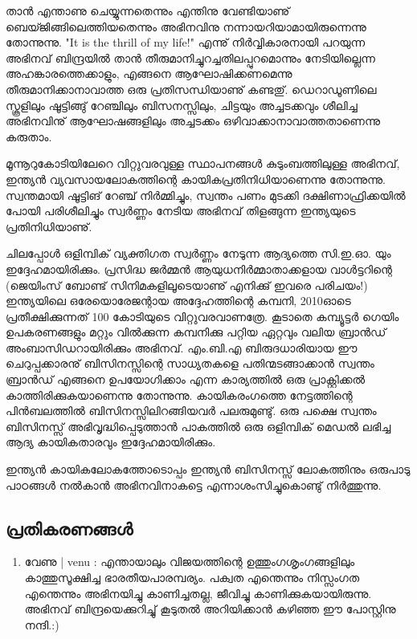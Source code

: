 ﻿
\vskip 2pt

താന്‍ എന്താണു ചെയ്യുന്നതെന്നും എന്തിനു വേണ്ടിയാണു് ബെയ്ജിങ്ങിലെത്തിയതെന്നും അഭിനവിനു നന്നായറിയാമായിരുന്നെന്നു തോന്നുന്നു. "It is the thrill of my life!" എന്നു് നിര്‍വ്വികാരനായി പറയുന്ന അഭിനവ് ബിന്ദ്രയില്‍ താന്‍ തീരുമാനിച്ചുറച്ചതിലപ്പുറമൊന്നും നേടിയില്ലെന്ന അഹങ്കാരത്തെക്കാളും, എങ്ങനെ ആഘോഷിക്കണമെന്നു തീരുമാനിക്കാനാവാത്ത ഒരു പ്രതിസന്ധിയാണു് കണ്ടതു്. ഡെറാഡൂണിലെ സ്കൂളിലും ഷൂട്ടിങ്ങു് റേഞ്ചിലും ബിസനസ്സിലും, ചിട്ടയും അച്ചടക്കവും ശീലിച്ച അഭിനവിനു് ആഘോഷങ്ങളിലും അച്ചടക്കം ഒഴിവാക്കാനാവാത്തതാണെന്നു കരുതാം.

മൂന്നൂറുകോടിയിലേറെ വിറ്റുവരവുള്ള സ്ഥാപനങ്ങള്‍ കുടുംബത്തിലുള്ള അഭിനവ്, ഇന്ത്യന്‍ വ്യവസായലോകത്തിന്റെ കായികപ്രതിനിധിയാണെന്നു തോന്നുന്നു. സ്വന്തമായി ഷൂട്ടിങ് റേഞ്ച് നിര്‍മ്മിച്ചും, സ്വന്തം പണം മുടക്കി ദക്ഷിണാഫ്രിക്കയില്‍ പോയി പരിശീലിച്ചും സ്വര്‍ണ്ണം നേടിയ അഭിനവ് തിളങ്ങുന്ന ഇന്ത്യയുടെ പ്രതിനിധിയാണു്.

ചിലപ്പോള്‍ ഒളിമ്പിക് വ്യക്തിഗത സ്വര്‍ണ്ണം നേടുന്ന ആദ്യത്തെ സി.ഇ.ഓ. യും ഇദ്ദേഹമായിരിക്കും. പ്രസിദ്ധ ജര്‍മ്മന്‍ ആയുധനിര്‍മ്മാതാക്കളായ വാള്‍ട്ടറിന്റെ (ജെയിംസ് ബോണ്ട് സിനിമകളിലൂടെയാണു് എനിക്കു് ഇവരെ പരിചയം!) ഇന്ത്യയിലെ ഒരേയൊരേജന്റായ അദ്ദേഹത്തിന്റെ കമ്പനി, 2010ഓടെ പ്രതീക്ഷിക്കുന്നത് 100 കോടിയുടെ വിറ്റുവരവാണത്രേ. കൂടാതെ കമ്പ്യൂട്ടര്‍ ഗെയിം ഉപകരണങ്ങളും മറ്റും വില്‍ക്കുന്ന കമ്പനിക്കു പറ്റിയ ഏറ്റവും വലിയ ബ്രാന്‍ഡ് അംബാസിഡറായിരിക്കും അഭിനവ്. എം.ബി.എ ബിരുദധാരിയായ ഈ ചെറുപ്പക്കാരനു് ബിസിനസ്സിന്റെ സാധ്യതകളെ പതിന്മടങ്ങാക്കാന്‍ സ്വന്തം ബ്രാന്‍ഡ് എങ്ങനെ ഉപയോഗിക്കാം എന്ന കാര്യത്തില്‍ ഒരു പ്രാക്റ്റിക്കല്‍ കാത്തിരിക്കുകയാണെന്നു തോന്നുന്നു. കായികരംഗത്തെ നേട്ടത്തിന്റെ പിന്‍ബലത്തില്‍ ബിസിനസ്സിലിറങ്ങിയവര്‍ പലരുമുണ്ടു്. ഒരു പക്ഷെ സ്വന്തം ബിസിനസ്സ് അഭിവൃദ്ധിപ്പെടുത്താന്‍ പാകത്തില്‍ ഒരു ഒളിമ്പിക് മെഡല്‍ ലഭിച്ച ആദ്യ കായികതാരവും ഇദ്ദേഹമായിരിക്കും.

ഇന്ത്യന്‍ കായികലോകത്തോടൊപ്പം ഇന്ത്യന്‍ ബിസിനസ്സ് ലോകത്തിനും ഒരുപാടു പാഠങ്ങള്‍ നല്‍കാന്‍ അഭിനവിനാകട്ടെ എന്നാശംസിച്ചുകൊണ്ടു് നിര്‍ത്തുന്നു.

\subsection*{പ്രതികരണങ്ങള്‍}
\begin{enumerate}
\item{വേണു | venu : }
എന്തായാലും വിജയത്തിന്റെ ഉത്തുംഗശൃംഗങ്ങളിലും കാത്തുസൂക്ഷിച്ച ഭാരതീയപാരമ്പര്യം. പക്വത എന്തെന്നും നിസ്സംഗത എന്തെന്നും അഭിനയിച്ചു കാണിച്ചതല്ല, ജീവിച്ചു കാണിക്കുകയായിരുന്നു. അഭിനവ് ബിന്ദ്രയെക്കുറിച്ചു് കൂടുതല്‍ അറിയിക്കാന്‍ കഴിഞ്ഞ ഈ പോസ്റ്റിനു നന്ദി.:)

\end{enumerate}

\newpage
